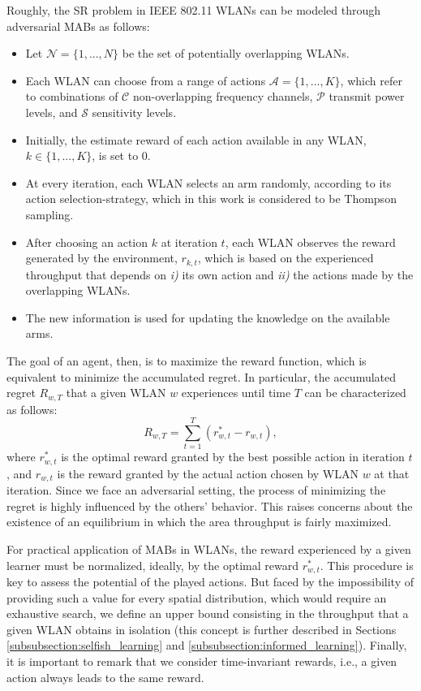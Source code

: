 \documentclass[preprint,12pt]{elsarticle}
\begin{document}
Roughly, the SR problem in IEEE 802.11 WLANs can be modeled through adversarial MABs as follows:	
\begin{itemize}
	\item Let $\mathcal{N} = \{1,..., N\}$ be the set of potentially overlapping WLANs.
	\item Each WLAN can choose from a range of actions $\mathcal{A} = \{1,..., K\}$, which refer to combinations of $\mathcal{C}$ non-overlapping frequency channels, $\mathcal{P}$ transmit power levels, and $\mathcal{S}$ sensitivity levels.
	\item Initially, the estimate reward of each action available in any WLAN, $k \in \{1,...,K\}$, is set to 0.
	\item At every iteration, each WLAN selects an arm randomly, according to its action selection-strategy, which in this work is considered to be Thompson sampling.
	\item After choosing an action $k$ at iteration $t$, each WLAN observes the reward generated by the environment, $r_{k,t}$, which is based on the experienced throughput that depends on \emph{i)} its own action and \emph{ii)} the actions made by the overlapping WLANs.
	\item The new information is used for updating the knowledge on the available arms.
\end{itemize}

The goal of an agent, then, is to maximize the reward function, which is equivalent to minimize the accumulated regret. In particular, the accumulated regret $R_{w,T}$ that a given WLAN $w$ experiences until time $T$ can be characterized as follows:
\begin{equation}
R_{w,T} = \sum_{t = 1}^{T} (r_{w,t}^* - r_{w,t}),
\nonumber
\end{equation}
where $r_{w,t}^*$ is the optimal reward granted by the best possible action in iteration $t$, and $r_{w,t}$ is the reward granted by the actual action chosen by WLAN $w$ at that iteration. Since we face an adversarial setting, the process of minimizing the regret is highly influenced by the others' behavior. This raises concerns about the existence of an equilibrium in which the area throughput is fairly maximized. 

For practical application of MABs in WLANs, the reward experienced by a given learner must be normalized, ideally, by the optimal reward $r_{w,t}^*$. This procedure is key to assess the potential of the played actions. But faced by the impossibility of providing such a value for every spatial distribution, which would require an exhaustive search, we define an upper bound consisting in the throughput that a given WLAN obtains in isolation (this concept is further described in Sections \ref{subsubsection:selfish_learning} and \ref{subsubsection:informed_learning}). Finally, it is important to remark that we consider time-invariant rewards, i.e., a given action  always leads to the same reward.
\end{document}
